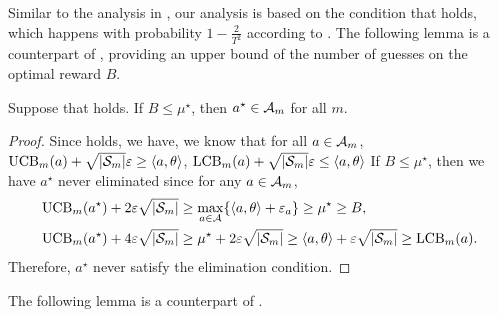 Similar to the analysis in , our analysis is based on the condition that  holds, which happens with probability $1-\frac{2}{T^2}$ according to . The following lemma is a counterpart of , providing an upper bound of the number of guesses on the optimal reward $B$.

\begin{lemma}\label{lem:end-of-B-reward}
    Suppose that  holds. If $B\leq \mu^\star$, then $a^\star\in {\mathcal{A}}_m$ for all $m$.
\end{lemma}
\begin{proof}
    Since  holds, we have, we know that for all $a\in{\mathcal{A}}_m$, ${\operatorname{UCB}}_m(a)+\sqrt{|{\mathcal{S}}_m|}\varepsilon\geq \left\langle {a,\theta} \right\rangle$, ${\operatorname{LCB}}_m(a)+\sqrt{|{\mathcal{S}}_m|}\varepsilon\leq \left\langle {a,\theta} \right\rangle$
    If $B\leq \mu^\star$, then we have $a^\star$ never eliminated since for any $a\in{\mathcal{A}}_m$,
    \begin{align*}
         {\operatorname{UCB}}_{m}(a^\star) +2\varepsilon\sqrt{|{\mathcal{S}}_m|} &\geq \max_{a\in{\mathcal{A}}}\{\left\langle {a,\theta} \right\rangle+\varepsilon_a\} \geq \mu^\star \geq B,\\
         {\operatorname{UCB}}_{m}(a^\star) +4\varepsilon\sqrt{|{\mathcal{S}}_m|} &\geq \mu^\star + 2\varepsilon\sqrt{|{\mathcal{S}}_m|} \geq \left\langle {a,\theta} \right\rangle  + \varepsilon\sqrt{|{\mathcal{S}}_m|}\geq {\operatorname{LCB}}_m(a).
    \end{align*}
    Therefore, $a^\star$ never satisfy the elimination condition.
\end{proof}

The following lemma is a counterpart of .

